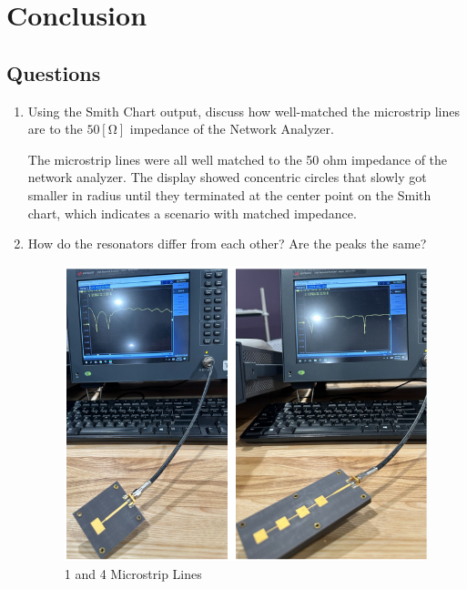 \documentclass[
	letterpaper, %
	10pt, %
]{CSUniSchoolLabReport}
\begin{document}
\section{Conclusion}

\subsection{Questions}

\begin{enumerate}

  \item Using the Smith Chart output, discuss how well-matched the microstrip lines are to the $50[\si{\ohm}]$ impedance of the Network Analyzer.

    The microstrip lines were all well matched to the 50 ohm impedance of the network analyzer. The display showed concentric circles that slowly got smaller in radius until they terminated at the center point on the Smith chart, which indicates a scenario with matched impedance.

  \item How do the resonators differ from each other? Are the peaks the same?

    \begin{figure}[H]
      \centering
      \includegraphics[width=.6\textwidth]{Figures/Lab Three/Peaks-1-4.png}
      \caption{1 and 4 Microstrip Lines}
      \label{fig:5}
    \end{figure}


\end{enumerate}
\end{document}
